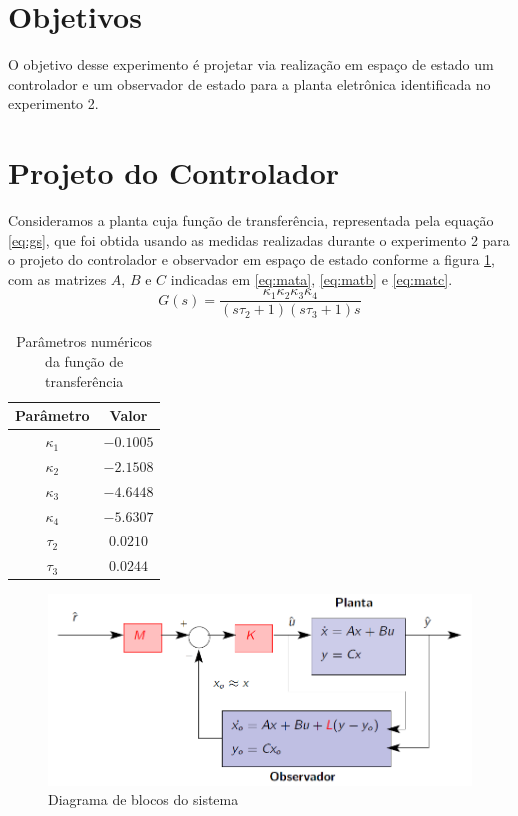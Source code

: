 \documentclass{article}
\begin{document}


\onehalfspacing
\section{Objetivos} 
O objetivo desse experimento é projetar via realização em espaço de estado um controlador e um observador de estado para a planta eletrônica identificada no experimento 2\cite{bb:lab2}. 
	
\section{Projeto do Controlador}
Consideramos a planta cuja função de transferência, representada pela equação \ref{eq:gs}, que foi obtida usando as medidas realizadas durante o experimento 2\cite{bb:lab2} para o projeto do controlador e observador em espaço de estado conforme a figura \ref{fig:contrss}, com as matrizes $A$, $B$ e $C$ indicadas em \ref{eq:mata}, \ref{eq:matb} e \ref{eq:matc}.\\

\begin{equation}
\label{eq:gs}
G(s) = \frac{\kappa_1\kappa_2\kappa_3\kappa_4}{(s\tau_2 + 1)(s\tau_3 + 1)s}
\end{equation}

\begin{table}[H]
	\centering
	\caption{Parâmetros numéricos da função de transferência}
	\label{tab:valores}
	\begin{tabular}{|c|c|}
		\hline Parâmetro & Valor \\ 
		\hline $\kappa_1$ & $-0.1005$\\ 
		\hline $\kappa_2$ & $-2.1508$\\ 
		\hline $\kappa_3$ & $-4.6448$\\ 
		\hline $\kappa_4$ & $-5.6307$\\ 
		\hline $\tau_2$ & $0.0210$\\ 
		\hline $\tau_3$ & $0.0244$ \\ 	
		\hline 
	\end{tabular} 
\end{table}

\begin{figure}[H]
	\centering
	\includegraphics[width=0.8\linewidth]{contrss}
	\caption{Diagrama de blocos do sistema}
	\label{fig:contrss}
\end{figure}
\end{document}
